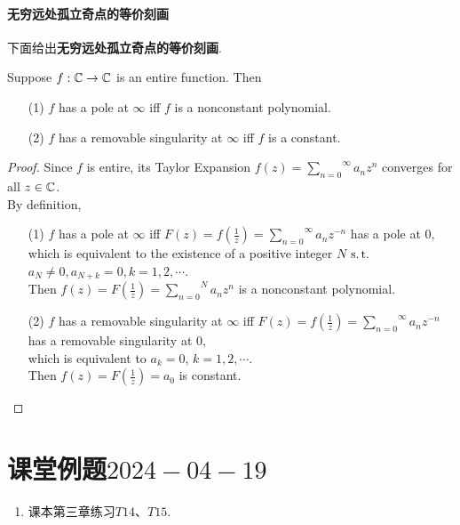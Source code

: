 \paragraph{无穷远处孤立奇点的等价刻画}
	下面给出\textbf{无穷远处孤立奇点的等价刻画}.
	\begin{proposition}\label{prop 8.6.1}
		Suppose $f : \mathbb{C} \rightarrow \mathbb{C}$ is an entire function. Then
		\begin{enumerate}
			\item[(1)]$f$ has a pole at $\infty$ iff $f$ is a nonconstant polynomial.
			
			\item[(2)]$f$ has a removable singularity at $\infty$ iff $f$ is a constant.
		\end{enumerate}
	
		\vspace{2em}
		\begin{proof}
			Since $f$ is entire, its Taylor Expansion $f(z) = \overset{\infty}{\underset{n = 0}{\sum}}{a_n z^n}$ converges for all $z \in \mathbb{C}$. \\
			By definition,
			\begin{enumerate}
				\item[(1)]$f$ has a pole at $\infty$ iff $F(z) = f(\frac{1}{z}) = \overset{\infty}{\underset{n = 0}{\sum}}{a_n z^{-n}}$ has a pole at $0$,  \\
				which is equivalent to the existence of a positive integer $N$ $\operatorname{s.t.}$ $a_{N} \neq 0 , a_{N + k} = 0 , k = 1 , 2 , \cdots$. \\
				Then $f(z) = F(\frac{1}{z}) = \overset{N}{\underset{n = 0}{\sum}}{a_n z^n}$ is a nonconstant polynomial.
				
				\vspace{1em}
				
				\item[(2)]$f$ has a removable singularity at $\infty$ iff $F(z) = f(\frac{1}{z}) = \overset{\infty}{\underset{n = 0}{\sum}}{a_n z^{-n}}$ has a removable singularity at $0$, \\
				which is equivalent to $a_k = 0$, $k = 1 , 2 , \cdots$. \\
				Then $f(z) = F(\frac{1}{z}) = a_0$ is constant.
			\end{enumerate}
		\end{proof}
	\end{proposition}

\newpage
\section{课堂例题$2024-04-19$}
	\begin{enumerate}
		\item 课本第三章练习$T14$、$T15$.
	\end{enumerate}
	






	\ifx\allfiles\undefined

\fi